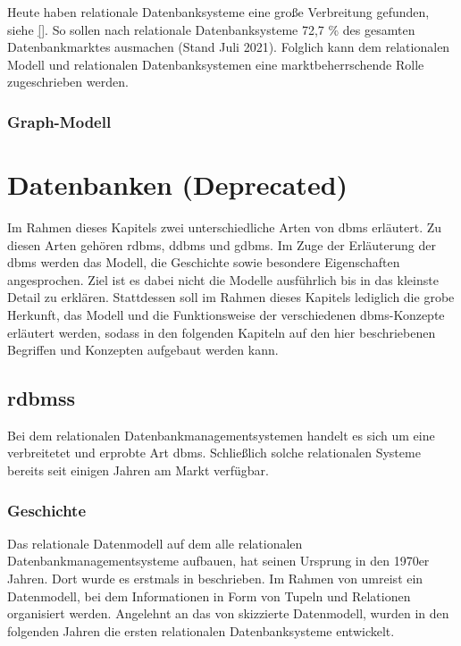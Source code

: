 Heute haben relationale Datenbanksysteme eine große Verbreitung gefunden, siehe \autoref{}. So sollen nach \cite{db_engines_ranking_july} relationale Datenbanksysteme 72,7 \% des gesamten Datenbankmarktes ausmachen (Stand Juli 2021). Folglich kann dem relationalen Modell und relationalen Datenbanksystemen eine marktbeherrschende Rolle zugeschrieben werden.

\subsubsection{Graph-Modell}

\section{Datenbanken (Deprecated)}
Im Rahmen dieses Kapitels zwei unterschiedliche Arten von \acl{dbms} erläutert. Zu diesen Arten gehören \acl{rdbms}, \acl{ddbms} und \acl{gdbms}. Im Zuge der Erläuterung der \acs{dbms} werden das Modell, die Geschichte sowie besondere Eigenschaften angesprochen. Ziel ist es dabei nicht die Modelle ausführlich bis in das kleinste Detail zu erklären. Stattdessen soll im Rahmen dieses Kapitels lediglich die grobe Herkunft, das Modell und die Funktionsweise der verschiedenen \acs{dbms}-Konzepte erläutert werden, sodass in den folgenden Kapiteln auf den hier beschriebenen Begriffen und Konzepten aufgebaut werden kann.   

\subsection{\acl{rdbms}s}
Bei dem relationalen Datenbankmanagementsystemen handelt es sich um eine verbreitetet und erprobte Art \acs{dbms}. Schließlich solche relationalen Systeme bereits seit einigen Jahren am Markt verfügbar. 

\subsubsection{Geschichte}
Das relationale Datenmodell auf dem alle relationalen Datenbankmanagementsysteme aufbauen, hat seinen Ursprung in den 1970er Jahren. Dort wurde es erstmals in \cite{codd_relational_model} beschrieben. Im Rahmen von \cite{codd_relational_model} umreist \citeauthor{codd_relational_model} ein Datenmodell, bei dem Informationen in Form von Tupeln und Relationen organisiert werden. Angelehnt an das von \citeauthor{codd_relational_model} skizzierte Datenmodell, wurden in den folgenden Jahren die ersten relationalen Datenbanksysteme entwickelt. 


